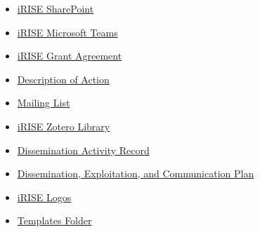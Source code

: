 \documentclass[
]{article}
\begin{document}
\begin{itemize}
\item
  \href{https://charitede.sharepoint.com/sites/iRISE/Shared\%20Documents/Forms/AllItems.aspx}{iRISE SharePoint}
\item
  \href{https://teams.microsoft.com/l/team/19\%3aBeyH-eKopgikP84hU4FuJggrTXugFiipnYUq8krUnAE1\%40thread.tacv2/conversations?groupId=63cd0d10-aa1b-4db9-9bb0-ed23b58ec69b\&tenantId=afe91939-923e-432c-bc66-cbc3ec18d02c}{iRISE Microsoft Teams}
\item
  \href{https://charitede.sharepoint.com/:f:/r/sites/iRISE/Shared\%20Documents/General/Grant\%20Agreement/AMD-101094853-4_Nov2023?csf=1\&web=1\&e=cuFpdE}{iRISE Grant Agreement}
\item
  \href{https://charitede.sharepoint.com/:b:/r/sites/iRISE/Shared\%20Documents/General/Grant\%20Agreement/GA\%20amendment\%20Sept.\%202023/iRISE_Annex1B_DoA_2023-09-25_v4_clean.pdf?csf=1\&web=1\&e=CGlIBC}{Description of Action}
\item
  \href{https://charitede.sharepoint.com/:w:/r/sites/iRISE/Shared\%20Documents/General/iRISE\%20Mailing\%20List\%20Full.docx?d=w78aadfc66f9b4bdc878dd41138496398\&csf=1\&web=1\&e=xnGHy4}{Mailing List}
\item
  \href{https://www.zotero.org/groups/5148075/irise_library}{iRISE Zotero Library}
\item
  \href{https://charitede.sharepoint.com/:x:/r/sites/iRISE/Shared\%20Documents/WP6/iRISE\%20Dissemination\%20Activity\%20Record.xlsx?d=w47a1cbfaa6c34ab5aee84a6dba643912\&csf=1\&web=1\&e=9cfBaW}{Dissemination Activity Record}
\item
  \href{https://charitede.sharepoint.com/:w:/r/sites/iRISE/Shared\%20Documents/WP6/iRISE\%20Dissemination\%20Plan_Draft\%201.2.docx?d=w7a63d0ea4a374c1bbe3b7fd98d0c7d2f\&csf=1\&web=1\&e=jY54DT}{Dissemination, Exploitation, and Communication Plan}
\item
  \href{https://charitede.sharepoint.com/:f:/r/sites/iRISE/Shared\%20Documents/Branding\%20and\%20Website/iRISE\%20Logos/Logos?csf=1\&web=1\&e=mh7pQM}{iRISE Logos}
\item
  \href{https://charitede.sharepoint.com/:f:/r/sites/iRISE/Shared\%20Documents/General/iRISE\%20Dissemination_Communication_Templates/Templates?csf=1\&web=1\&e=P8QVBa}{Templates Folder}


\end{itemize}
\end{document}
